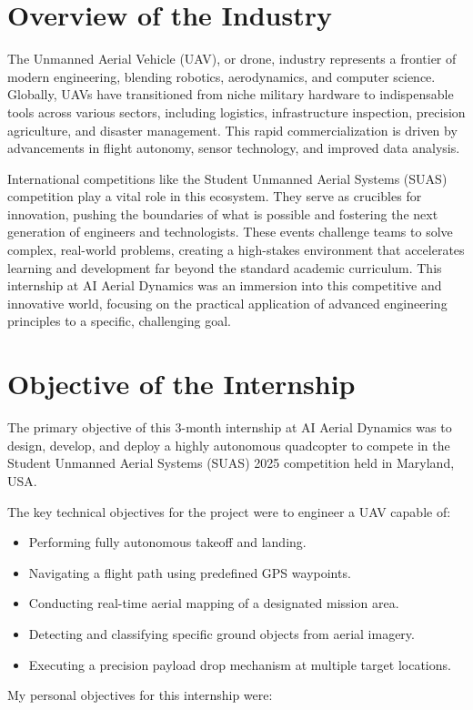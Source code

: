 \section{Overview of the Industry}

The Unmanned Aerial Vehicle (UAV), or drone, industry represents a frontier of modern engineering, blending robotics, aerodynamics, and computer science. Globally, UAVs have transitioned from niche military hardware to indispensable tools across various sectors, including logistics, infrastructure inspection, precision agriculture, and disaster management. This rapid commercialization is driven by advancements in flight autonomy, sensor technology, and improved data analysis.

International competitions like the Student Unmanned Aerial Systems (SUAS) competition play a vital role in this ecosystem. They serve as crucibles for innovation, pushing the boundaries of what is possible and fostering the next generation of engineers and technologists. These events challenge teams to solve complex, real-world problems, creating a high-stakes environment that accelerates learning and development far beyond the standard academic curriculum. This internship at AI Aerial Dynamics was an immersion into this competitive and innovative world, focusing on the practical application of advanced engineering principles to a specific, challenging goal.

\section{Objective of the Internship}
The primary objective of this 3-month internship at AI Aerial Dynamics was to design, develop, and deploy a highly autonomous quadcopter to compete in the Student Unmanned Aerial Systems (SUAS) 2025 competition held in Maryland, USA.

The key technical objectives for the project were to engineer a UAV capable of:
\begin{itemize}
	\item Performing fully autonomous takeoff and landing.
	\item Navigating a flight path using predefined GPS waypoints.
	\item Conducting real-time aerial mapping of a designated mission area.
	\item Detecting and classifying specific ground objects from aerial imagery.
	\item Executing a precision payload drop mechanism at multiple target locations.
\end{itemize}
\noindent
My personal objectives for this internship were:

